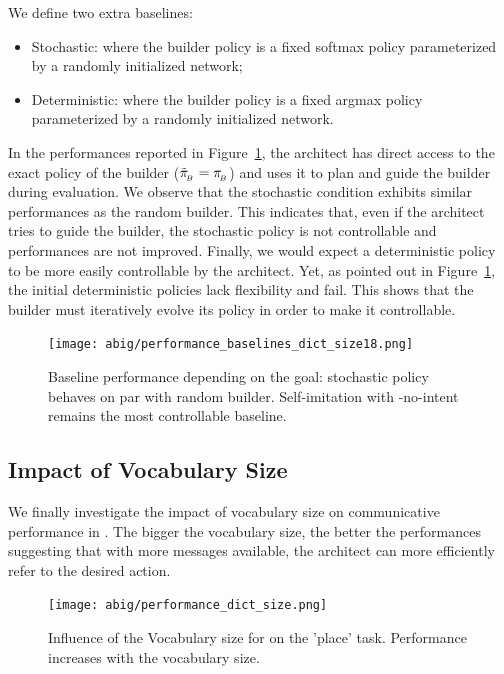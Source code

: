 We define two extra baselines: 
\begin{itemize}[noitemsep,topsep=0pt]
    \item Stochastic: where the builder policy is a fixed softmax policy parameterized by a randomly initialized network;
    \item Deterministic: where the builder policy is a fixed argmax policy parameterized by a randomly initialized network.
\end{itemize}
In the performances reported in Figure~\ref{fig:baseline_performance}, the architect has direct access to the exact policy of the builder ($\tilde{\pi}_{\!_B}=\pi_{\!_B}$) and uses it to plan and guide the builder during evaluation.  We observe that the stochastic condition exhibits similar performances as the random builder. This indicates that, even if the architect tries to guide the builder, the stochastic policy is not controllable and performances are not improved. Finally, we would expect a deterministic policy to be more easily controllable by the architect. Yet, as pointed out in Figure~\ref{fig:baseline_performance}, the initial deterministic policies lack flexibility and fail. This shows that the builder must iteratively evolve its policy in order to make it controllable.

\begin{figure}[h!]
    \centering
    \texttt{[image: abig/performance\_baselines\_dict\_size18.png]}
    \caption{Baseline performance depending on the goal: stochastic policy behaves on par with random builder. Self-imitation with \abig-no-intent remains the most controllable baseline.}
    \label{fig:baseline_performance}
\end{figure}

\subsection{Impact of Vocabulary Size}
\label{sec:sec_res_dict_size}
We finally investigate the impact of vocabulary size on \abig communicative performance in . The bigger the vocabulary size, the better the performances suggesting that with more messages available, the architect can more efficiently refer to the desired action.
\begin{figure}[h!]
    \centering
    \texttt{[image: abig/performance\_dict\_size.png]}
    \caption{Influence of the Vocabulary size for \abig on the 'place' task. Performance increases with the vocabulary size.}
    \label{fig:dict_size_performance}
\end{figure}




